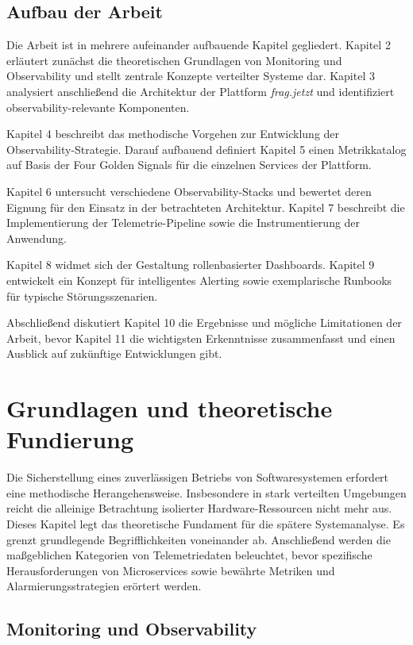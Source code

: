 \subsection{Aufbau der Arbeit}

Die Arbeit ist in mehrere aufeinander aufbauende Kapitel gegliedert. Kapitel 2 erläutert zunächst die theoretischen Grundlagen von Monitoring und Observability und stellt zentrale Konzepte verteilter Systeme dar. Kapitel 3 analysiert anschließend die Architektur der Plattform \emph{frag.jetzt} und identifiziert observability-relevante Komponenten.

Kapitel 4 beschreibt das methodische Vorgehen zur Entwicklung der Observability-Strategie. Darauf aufbauend definiert Kapitel 5 einen Metrikkatalog auf Basis der Four Golden Signals für die einzelnen Services der Plattform.

Kapitel 6 untersucht verschiedene Observability-Stacks und bewertet deren Eignung für den Einsatz in der betrachteten Architektur. Kapitel 7 beschreibt die Implementierung der Telemetrie-Pipeline sowie die Instrumentierung der Anwendung.

Kapitel 8 widmet sich der Gestaltung rollenbasierter Dashboards. Kapitel 9 entwickelt ein Konzept für intelligentes Alerting sowie exemplarische Runbooks für typische Störungsszenarien.

Abschließend diskutiert Kapitel 10 die Ergebnisse und mögliche Limitationen der Arbeit, bevor Kapitel 11 die wichtigsten Erkenntnisse zusammenfasst und einen Ausblick auf zukünftige Entwicklungen gibt.



\section{Grundlagen und theoretische Fundierung}

Die Sicherstellung eines zuverlässigen Betriebs von Softwaresystemen erfordert eine methodische Herangehensweise. Insbesondere in stark verteilten Umgebungen reicht die alleinige Betrachtung isolierter Hardware-Ressourcen nicht mehr aus. Dieses Kapitel legt das theoretische Fundament für die spätere Systemanalyse. Es grenzt grundlegende Begrifflichkeiten voneinander ab. Anschließend werden die maßgeblichen Kategorien von Telemetriedaten beleuchtet, bevor spezifische Herausforderungen von Microservices sowie bewährte Metriken und Alarmierungsstrategien erörtert werden.

\subsection{Monitoring und Observability}

